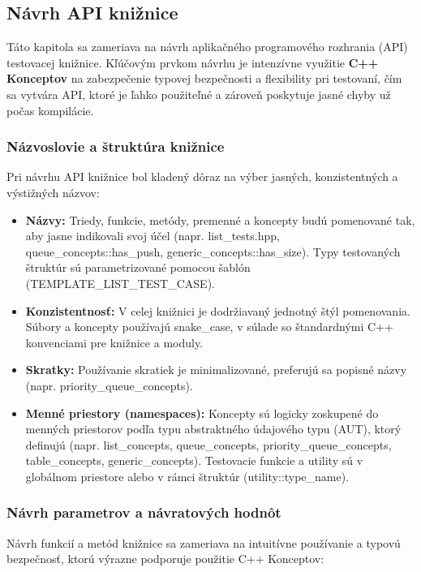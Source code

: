 \documentclass[11pt]{article}
\begin{document}
\subsection{Návrh API knižnice}
\label{sec:navrh_api}

Táto kapitola sa zameriava na návrh aplikačného programového rozhrania (API) testovacej knižnice. Kľúčovým prvkom návrhu je intenzívne využitie \textbf{C++ Konceptov} na zabezpečenie typovej bezpečnosti a flexibility pri testovaní, čím sa vytvára API, ktoré je ľahko použiteľné a zároveň poskytuje jasné chyby už počas kompilácie.

\subsubsection{Názvoslovie a štruktúra knižnice}

Pri návrhu API knižnice bol kladený dôraz na výber jasných, konzistentných a výstižných názvov:

\begin{itemize}
    \item \textbf{Názvy:} Triedy, funkcie, metódy, premenné a koncepty budú pomenované tak, aby jasne indikovali svoj účel (napr. list\_tests.hpp, queue\_concepts::has\_push, generic\_concepts::has\_size). Typy testovaných štruktúr sú parametrizované pomocou šablón (TEMPLATE\_LIST\_TEST\_CASE).
    \item \textbf{Konzistentnosť:} V celej knižnici je dodržiavaný jednotný štýl pomenovania. Súbory a koncepty používajú snake\_case, v súlade so štandardnými C++ konvenciami pre knižnice a moduly.
    \item \textbf{Skratky:} Používanie skratiek je minimalizované, preferujú sa popisné názvy (napr. priority\_queue\_concepts).
    \item \textbf{Menné priestory (namespaces):} Koncepty sú logicky zoskupené do menných priestorov podľa typu abstraktného údajového typu (AUT), ktorý definujú (napr. list\_concepts, queue\_concepts, priority\_queue\_concepts, table\_concepts, generic\_concepts). Testovacie funkcie a utility sú v globálnom priestore alebo v rámci štruktúr (utility::type\_name).
\end{itemize}

\subsubsection{Návrh parametrov a návratových hodnôt}

Návrh funkcií a metód knižnice sa zameriava na intuitívne používanie a typovú bezpečnosť, ktorú výrazne podporuje použitie C++ Konceptov:
\end{document}
